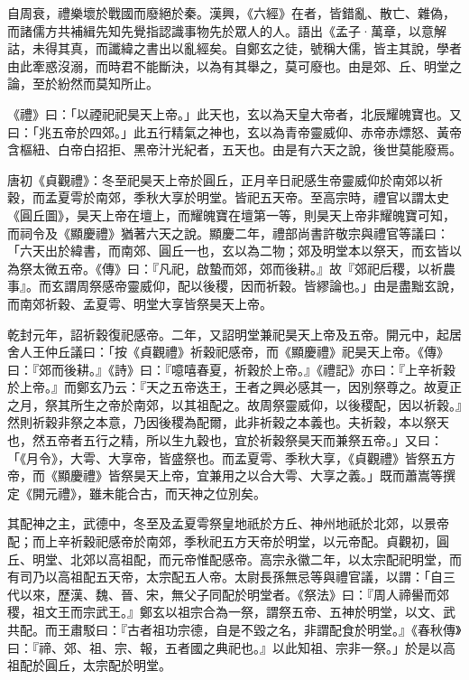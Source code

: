 
\begin{pinyinscope}

 自周衰，禮樂壞於戰國而廢絕於秦。漢興，《六經》在者，皆錯亂、散亡、雜偽，而諸儒方共補緝先知先覺指認識事物先於眾人的人。語出《孟子·萬章，以意解詁，未得其真，而讖緯之書出以亂經矣。自鄭玄之徒，號稱大儒，皆主其說，學者由此牽惑沒溺，而時君不能斷決，以為有其舉之，莫可廢也。由是郊、丘、明堂之論，至於紛然而莫知所止。



 《禮》曰：「以禋祀祀昊天上帝。」此天也，玄以為天皇大帝者，北辰耀魄寶也。又曰：「兆五帝於四郊。」此五行精氣之神也，玄以為青帝靈威仰、赤帝赤熛怒、黃帝含樞紐、白帝白招拒、黑帝汁光紀者，五天也。由是有六天之說，後世莫能廢焉。



 唐初《貞觀禮》：冬至祀昊天上帝於圓丘，正月辛日祀感生帝靈威仰於南郊以祈穀，而孟夏雩於南郊，季秋大享於明堂。皆祀五天帝。至高宗時，禮官以謂太史《圓丘圖》，昊天上帝在壇上，而耀魄寶在壇第一等，則昊天上帝非耀魄寶可知，而祠令及《顯慶禮》猶著六天之說。顯慶二年，禮部尚書許敬宗與禮官等議曰：「六天出於緯書，而南郊、圓丘一也，玄以為二物；郊及明堂本以祭天，而玄皆以為祭太微五帝。《傳》曰：『凡祀，啟蟄而郊，郊而後耕。』故『郊祀后稷，以祈農事』。而玄謂周祭感帝靈威仰，配以後稷，因而祈穀。皆繆論也。」由是盡黜玄說，而南郊祈穀、孟夏雩、明堂大享皆祭昊天上帝。



 乾封元年，詔祈穀復祀感帝。二年，又詔明堂兼祀昊天上帝及五帝。開元中，起居舍人王仲丘議曰：「按《貞觀禮》祈穀祀感帝，而《顯慶禮》祀昊天上帝。《傳》曰：『郊而後耕。』《詩》曰：『噫嘻春夏，祈穀於上帝。』《禮記》亦曰：『上辛祈穀於上帝。』而鄭玄乃云：『天之五帝迭王，王者之興必感其一，因別祭尊之。故夏正之月，祭其所生之帝於南郊，以其祖配之。故周祭靈威仰，以後稷配，因以祈穀。』然則祈穀非祭之本意，乃因後稷為配爾，此非祈穀之本義也。夫祈穀，本以祭天也，然五帝者五行之精，所以生九穀也，宜於祈穀祭昊天而兼祭五帝。」又曰：「《月令》，大雩、大享帝，皆盛祭也。而孟夏雩、季秋大享，《貞觀禮》皆祭五方帝，而《顯慶禮》皆祭昊天上帝，宜兼用之以合大雩、大享之義。」既而蕭嵩等撰定《開元禮》，雖未能合古，而天神之位別矣。



 其配神之主，武德中，冬至及孟夏雩祭皇地祇於方丘、神州地祇於北郊，以景帝配；而上辛祈穀祀感帝於南郊，季秋祀五方天帝於明堂，以元帝配。貞觀初，圓丘、明堂、北郊以高祖配，而元帝惟配感帝。高宗永徽二年，以太宗配祀明堂，而有司乃以高祖配五天帝，太宗配五人帝。太尉長孫無忌等與禮官議，以謂：「自三代以來，歷漢、魏、晉、宋，無父子同配於明堂者。《祭法》曰：『周人禘嚳而郊稷，祖文王而宗武王。』鄭玄以祖宗合為一祭，謂祭五帝、五神於明堂，以文、武共配。而王肅駁曰：『古者祖功宗德，自是不毀之名，非謂配食於明堂。』《春秋傳》曰：『禘、郊、祖、宗、報，五者國之典祀也。』以此知祖、宗非一祭。」於是以高祖配於圓丘，太宗配於明堂。




\end{pinyinscope}
